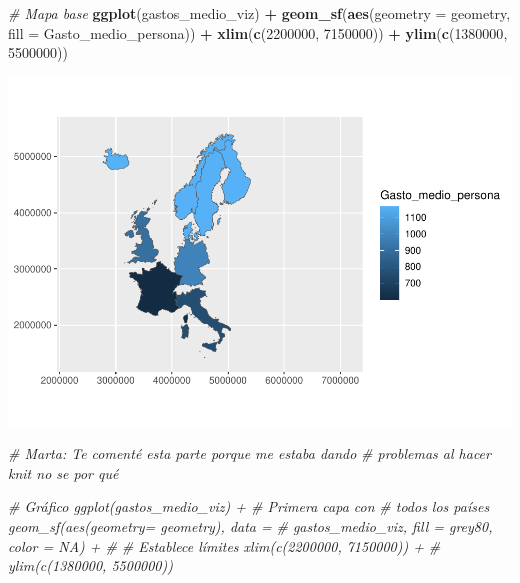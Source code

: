 \documentclass[data,article,submit,moreauthors,pdftex]{Definitions/mdpi}
\newenvironment{Shaded}{\begin{snugshade}}{\end{snugshade}}
\newcommand{\AttributeTok}[1]{\textcolor[rgb]{0.13,0.29,0.53}{#1}}
\newcommand{\CommentTok}[1]{\textcolor[rgb]{0.56,0.35,0.01}{\textit{#1}}}
\newcommand{\DecValTok}[1]{\textcolor[rgb]{0.00,0.00,0.81}{#1}}
\newcommand{\FunctionTok}[1]{\textcolor[rgb]{0.13,0.29,0.53}{\textbf{#1}}}
\newcommand{\NormalTok}[1]{#1}
\newcommand{\SpecialCharTok}[1]{\textcolor[rgb]{0.81,0.36,0.00}{\textbf{#1}}}
\begin{document}
\begin{Shaded}
\begin{Highlighting}[]
\CommentTok{\# Mapa base}
\FunctionTok{ggplot}\NormalTok{(gastos\_medio\_viz) }\SpecialCharTok{+} \FunctionTok{geom\_sf}\NormalTok{(}\FunctionTok{aes}\NormalTok{(}\AttributeTok{geometry =}\NormalTok{ geometry, }\AttributeTok{fill =}\NormalTok{ Gasto\_medio\_persona)) }\SpecialCharTok{+}
    \FunctionTok{xlim}\NormalTok{(}\FunctionTok{c}\NormalTok{(}\DecValTok{2200000}\NormalTok{, }\DecValTok{7150000}\NormalTok{)) }\SpecialCharTok{+} \FunctionTok{ylim}\NormalTok{(}\FunctionTok{c}\NormalTok{(}\DecValTok{1380000}\NormalTok{, }\DecValTok{5500000}\NormalTok{))}
\end{Highlighting}
\end{Shaded}

\includegraphics{ProyectoAED2024_Rmd_files/figure-latex/unnamed-chunk-31-1.pdf}

\begin{Shaded}
\begin{Highlighting}[]
\CommentTok{\# Marta: Te comenté esta parte porque me estaba dando}
\CommentTok{\# problemas al hacer knit no se por qué}

\CommentTok{\# Gráfico ggplot(gastos\_medio\_viz) + \# Primera capa con}
\CommentTok{\# todos los países geom\_sf(aes(geometry= geometry), data =}
\CommentTok{\# gastos\_medio\_viz, fill = \textquotesingle{}grey80\textquotesingle{}, color = NA) + \#}
\CommentTok{\# Establece límites xlim(c(2200000, 7150000)) +}
\CommentTok{\# ylim(c(1380000, 5500000))}
\end{Highlighting}
\end{Shaded}



\vspace{6pt}
\end{document}

